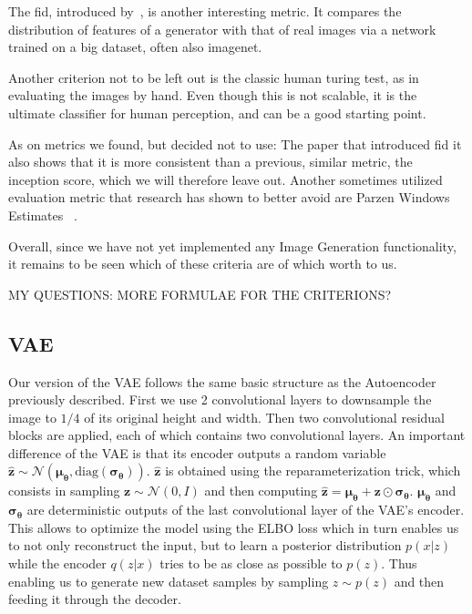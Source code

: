 The \ac{fid}, introduced by~\cite{fid}, is another interesting metric.
It compares the distribution of features of a generator with that of real images via a network trained on a big
dataset, often also imagenet.

Another criterion not to be left out is the classic human turing test, as in evaluating the images by hand.
Even though this is not scalable, it is the ultimate classifier for human perception, and can be a good starting
point.

As on metrics we found, but decided not to use: The paper that introduced \ac{fid} it also shows that it is more
consistent than a previous, similar metric, the inception score, which we will therefore leave out.
Another sometimes utilized evaluation metric that research has shown to better avoid are Parzen Windows Estimates~
\cite{note_on_eval}.

Overall, since we have not yet implemented any Image Generation functionality, it remains to be seen which of these
criteria are of which worth to us.

MY QUESTIONS: MORE FORMULAE FOR THE CRITERIONS?

\subsection{VAE}
Our version of the VAE follows the same basic structure as the Autoencoder
previously described. First we use 2 convolutional layers to downsample the
image to $1/4$ of its original height and width. Then two convolutional
residual blocks are applied, each of which contains two convolutional layers.
An important difference of the VAE is that its encoder outputs a random
variable $\boldsymbol{\hat{z}} \sim \mathcal{N}(\boldsymbol{\mu_\theta}, \text{diag}
(\boldsymbol{\sigma_\theta}))$. $\boldsymbol{\hat{z}}$ is obtained using the
reparameterization trick, which consists in sampling $\boldsymbol{z}
\sim \mathcal{N}(0, I)$ and then computing $\boldsymbol{\hat{z}} =
\boldsymbol{\mu_\theta} + \boldsymbol{z} \odot \boldsymbol{\sigma_\theta}$.
$\boldsymbol{\mu_\theta}$ and $\boldsymbol{\sigma_\theta}$ are deterministic
outputs of the last convolutional layer of the VAE's encoder. This allows to
optimize the model using the ELBO loss which in turn enables us to not only
reconstruct the input, but to learn a posterior distribution $p(x|z)$ while
the encoder $q(z|x)$ tries to be as close as possible to $p(z)$. Thus enabling
us to generate new dataset samples by sampling $z \sim p(z)$ and then feeding
it through the decoder.

